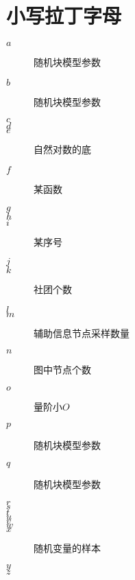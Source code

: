 \documentclass{ctexart}
\begin{document}
\section{小写拉丁字母}
\begin{description}
    \item[$a$] 随机块模型参数
    \item[$b$] 随机块模型参数
    \item[$c$] 
    \item[$d$] 
    \item[$e$] 自然对数的底
    \item[$f$] 某函数
    \item[$g$] 
    \item[$h$] 
    \item[$i$] 某序号
    \item[$j$] 
    \item[$k$] 社团个数
    \item[$l$] 
    \item[$m$] 辅助信息节点采样数量
    \item[$n$] 图中节点个数
    \item[$o$] 量阶小$O$
    \item[$p$] 随机块模型参数
    \item[$q$] 随机块模型参数
    \item[$r$] 
    \item[$s$] 
    \item[$t$] 
    \item[$u$] 
    \item[$v$] 
    \item[$w$] 
    \item[$x$] 随机变量的样本
    \item[$y$] 
    \item[$z$] 
\end{description}
\end{document}

